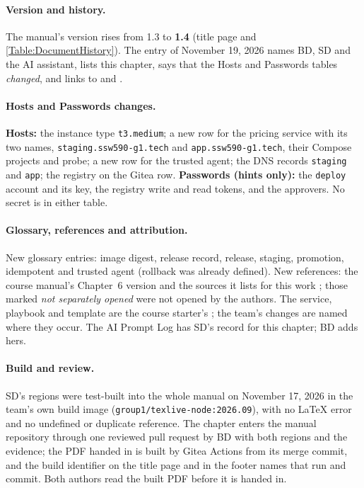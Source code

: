 \paragraph{Version and history.} The manual's version rises from 1.3 to \textbf{1.4} (title page and \ref{Table:DocumentHistory}). The entry of November 19, 2026 names BD, SD and the AI assistant, lists this chapter, says that the Hosts and Passwords tables \emph{changed},
and links to  and .

\paragraph{Hosts and Passwords changes.} \textbf{Hosts:} the instance type \texttt{t3.medium}; a new row for the pricing service with its two names, \texttt{staging.ssw590-g1.tech} and \texttt{app.ssw590-g1.tech}, their Compose projects and probe; a new row for the trusted agent;
the DNS records \texttt{staging} and \texttt{app}; the registry on the Gitea row. \textbf{Passwords (hints only):} the \texttt{deploy} account and its key, the registry write and read tokens, and the approvers. No secret is in either table.

\paragraph{Glossary, references and attribution.} New glossary entries: image digest, release record, release, staging, promotion, idempotent and trusted agent (rollback was already defined). New references: the course manual's Chapter~6 version \cite{DosManualV143} and the sources it lists for this work
\cite{AnsibleGettingStarted,AnsibleBecome,DockerBuildBestPractices,DockerCompose,DockerEngineSecurity,GiteaContainerRegistry,JenkinsPipelineSyntax,FlaskDeploying}; those marked \emph{not separately opened} were not opened by the authors.
The service, playbook and template are the course starter's \cite{DosManualV143}; the team's changes are named where they occur. The AI Prompt Log has SD's record for this chapter; BD adds hers.

\paragraph{Build and review.} SD's regions were test-built into the whole manual on November 17, 2026 in the team's own build image (\texttt{group1/texlive-node:2026.09}), with no LaTeX error and no undefined or duplicate reference. The chapter enters the manual repository through one reviewed pull request by BD
with both regions and the evidence; the PDF handed in is built by Gitea Actions from its merge commit, and the build identifier on the title page and in the footer names that run and commit. Both authors read the built PDF before it is handed in.
